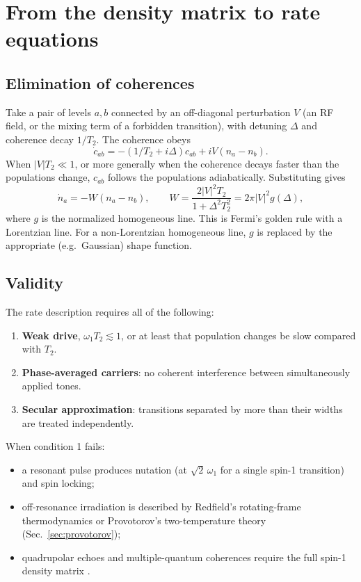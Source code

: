 \documentclass[11pt]{article}
\begin{document}
\section{From the density matrix to rate equations}
\label{sec:reduction}

\subsection{Elimination of coherences}
Take a pair of levels $a,b$ connected by an off-diagonal perturbation $V$ (an RF field, or the
mixing term of a forbidden transition), with detuning $\Delta$ and coherence decay $1/T_2$.
The coherence obeys
\[
\dot c_{ab}=-(1/T_2+i\Delta)c_{ab}+iV(n_a-n_b).
\]
When $|V|T_2\ll1$, or more generally when the coherence decays faster than the populations
change, $c_{ab}$ follows the populations adiabatically. Substituting gives
\cite{Abragam1961,Slichter1990}
\begin{equation}
\dot n_a=-W(n_a-n_b),\qquad
W=\frac{2|V|^2T_2}{1+\Delta^2T_2^2}=2\pi|V|^2 g(\Delta),
\label{eq:golden}
\end{equation}
where $g$ is the normalized homogeneous line. This is Fermi's golden rule with a Lorentzian
line. For a non-Lorentzian homogeneous line, $g$ is replaced by the appropriate
(e.g.\ Gaussian) shape function.

\subsection{Validity}
The rate description requires all of the following:
\begin{enumerate}
\item \textbf{Weak drive}, $\omega_1 T_2\lesssim1$, or at least that population changes be
slow compared with $T_2$.
\item \textbf{Phase-averaged carriers}: no coherent interference between simultaneously
applied tones.
\item \textbf{Secular approximation}: transitions separated by more than their widths are
treated independently.
\end{enumerate}
When condition 1 fails:
\begin{itemize}
\item a resonant pulse produces nutation (at $\sqrt2\,\omega_1$ for a single spin-1
transition) and spin locking;
\item off-resonance irradiation is described by Redfield's rotating-frame thermodynamics
\cite{Redfield1955} or Provotorov's two-temperature theory \cite{Provotorov1962}
(Sec.~\ref{sec:provotorov});
\item quadrupolar echoes and multiple-quantum coherences require the full spin-1 density
matrix \cite{Wasylishen2012}.
\end{itemize}
\end{document}
